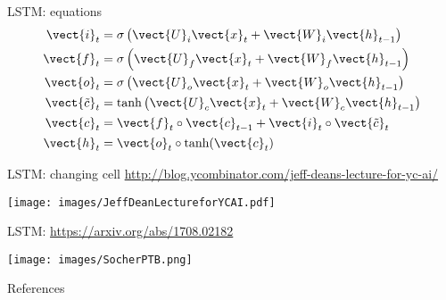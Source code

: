 \documentclass[10pt]{beamer}
\begin{document}
\begin{frame}{LSTM: equations}
\LARGE{
\begin{align*}
\vect{i}_t &= \sigma \left ( \vect{U}_i \vect{x}_t + \vect{W}_i \vect{h}_{t-1} \right ) \\
\vect{f}_t &= \sigma \left ( \vect{U}_f \vect{x}_t + \vect{W}_f \vect{h}_{t-1} \right ) \\
\vect{o}_t &= \sigma \left ( \vect{U}_o \vect{x}_t + \vect{W}_o \vect{h}_{t-1} \right ) \\
\vect{\tilde{c}}_t &= \textnormal{tanh} \left ( \vect{U}_c \vect{x}_t + \vect{W}_c \vect{h}_{t-1} \right ) \\
\vect{c}_t &= \vect{f}_t \circ \vect{c}_{t-1} + \vect{i}_t \circ \vect{\tilde{c}}_t \\
\vect{h}_t &= \vect{o}_t \circ \textnormal{tanh}(\vect{c}_t)
\end{align*}}
\end{frame}


\begin{frame}{LSTM: changing cell}
\url{http://blog.ycombinator.com/jeff-deans-lecture-for-yc-ai/}

\begin{center}
\texttt{[image: images/JeffDeanLectureforYCAI.pdf]}
\end{center}
\nocite{DeepLearningbook}

\end{frame}


\begin{frame}{LSTM: \url{https://arxiv.org/abs/1708.02182}}

\begin{center}
\texttt{[image: images/SocherPTB.png]}
\end{center}

\end{frame}


\begin{frame}[allowframebreaks]{References}

  
  

\end{frame}
\end{document}
